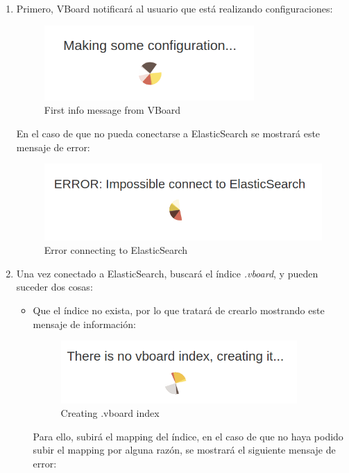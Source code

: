 \documentclass[a4paper, 12pt]{book}
\begin{document}
\begin{enumerate}

    \item Primero, VBoard notificará al usuario que está realizando configuraciones:
    \begin{figure}[H]
      \centering
      \includegraphics[width=8cm, keepaspectratio]{img/results/Init1}
      \caption{First info message from VBoard}
      \label{fig:onlynodes}
    \end{figure}
    En el caso de que no pueda conectarse a ElasticSearch se mostrará este mensaje de error:
    \begin{figure}[H]
      \centering
      \includegraphics[width=11cm, keepaspectratio]{img/results/Init2}
      \caption{Error connecting to ElasticSearch}
      \label{fig:onlynodes}
    \end{figure}
    \item Una vez conectado a ElasticSearch, buscará el índice \textit{.vboard}, y pueden suceder dos cosas:
    \begin{itemize}
        \item Que el índice no exista, por lo que tratará de crearlo mostrando este mensaje de información:
        \begin{figure}[H]
          \centering
          \includegraphics[width=9cm, keepaspectratio]{img/results/Init3}
          \caption{Creating .vboard index}
          \label{fig:onlynodes}
        \end{figure}
        Para ello, subirá el mapping del índice, en el caso de que no haya podido subir el mapping por alguna razón, se mostrará el siguiente mensaje de error:

\end{itemize}
\end{enumerate}
\end{document}
